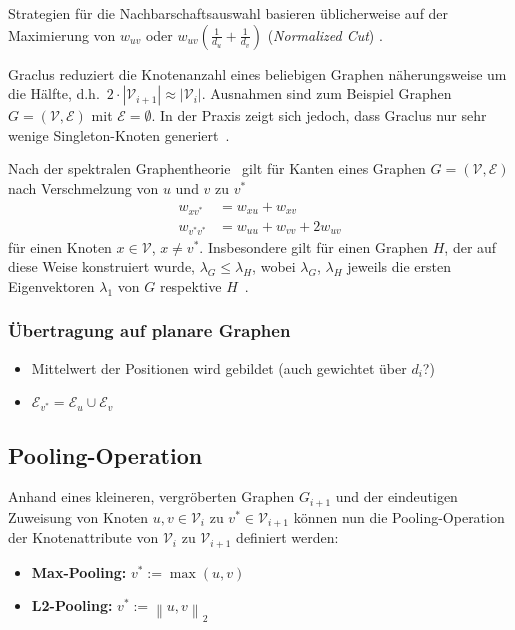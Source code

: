 Strategien für die Nachbarschaftsauswahl basieren üblicherweise auf der Maximierung von $w_{uv}$ oder $w_{uv}\left( \frac{1}{d_u} + \frac{1}{d_v} \right)$ (\emph{Normalized Cut}) .

Graclus reduziert die Knotenanzahl eines beliebigen Graphen näherungsweise um die Hälfte, d.h.\ $2 \cdot |\mathcal{V}_{i+1}| \approx |\mathcal{V}_i|$.
Ausnahmen sind zum Beispiel Graphen $G = (\mathcal{V}, \mathcal{E})$ mit $\mathcal{E} = \emptyset$.
In der Praxis zeigt sich jedoch, dass Graclus nur sehr wenige Singleton-Knoten generiert~\cite{Defferrard}.

Nach der spektralen Graphentheorie~\cite{Chung} gilt für Kanten eines Graphen $G = (\mathcal{V}, \mathcal{E})$ nach Verschmelzung von $u$ und $v$ zu $v^*$
\begin{align}
  w_{xv^*} &= w_{xu} + w_{xv}\\
  w_{v^*v^*} &= w_{uu} + w_{vv} + 2w_{uv}
\end{align}
für einen Knoten $x \in \mathcal{V}$, $x \neq v^*$.
Insbesondere gilt für einen Graphen $H$, der auf diese Weise konstruiert wurde, $\lambda_G \leq \lambda_H$, wobei $\lambda_G$, $\lambda_H$ jeweils die ersten Eigenvektoren $\lambda_1$ von $G$ respektive $H$~\cite{Chung}.

\subsubsection{Übertragung auf planare Graphen}

\begin{itemize}
  \item Mittelwert der Positionen wird gebildet (auch gewichtet über $d_i$?)
  \item $\mathcal{E}_{v^*} = \mathcal{E}_u \cup \mathcal{E}_v$ 
\end{itemize}

\subsection{Pooling-Operation}

Anhand eines kleineren, vergröberten Graphen $G_{i+1}$ und der eindeutigen Zuweisung von Knoten $u, v \in \mathcal{V}_i$ zu $v^* \in \mathcal{V}_{i+1}$ können nun die Pooling-Operation der Knotenattribute von $\mathcal{V}_{i}$ zu $\mathcal{V}_{i+1}$ definiert werden:

\begin{itemize}
  \item \textbf{Max-Pooling:} $v^* := \max(u, v)$
  \item \textbf{L2-Pooling:} $v^* := \left\| u, v \right\|_2$
\end{itemize}



